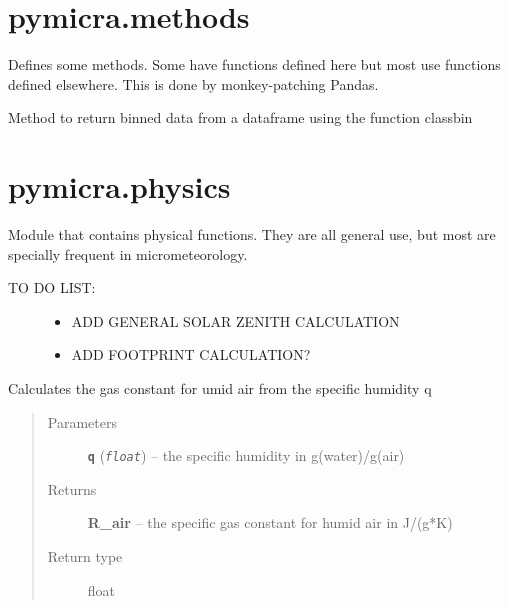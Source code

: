 \documentclass[a4paper,10pt,oneside]{sphinxmanual}
\begin{document}
\section{pymicra.methods}
\label{pymicra:module-pymicra.methods}\label{pymicra:pymicra-methods}
Defines some methods. Some have functions defined here but most use
functions defined elsewhere. This is done by monkey-patching Pandas.

\begin{fulllineitems}
\label{pymicra:pymicra.methods.binwrapper}
Method to return binned data from a dataframe using the function classbin

\end{fulllineitems}



\section{pymicra.physics}
\label{pymicra:module-pymicra.physics}\label{pymicra:pymicra-physics}
Module that contains physical functions. They are all general use, but
most are specially frequent in micrometeorology.
\begin{description}
\item[{TO DO LIST:}] \leavevmode\begin{itemize}
\item {} 
ADD GENERAL SOLAR ZENITH CALCULATION

\item {} 
ADD FOOTPRINT CALCULATION?

\end{itemize}

\end{description}

\begin{fulllineitems}
\label{pymicra:pymicra.physics.R_moistAir}
Calculates the gas constant for umid air from the specific humidity q
\begin{quote}\begin{description}
\item[{Parameters}] \leavevmode
\textbf{\texttt{q}} (\emph{\texttt{float}}) -- the specific humidity in g(water)/g(air)

\item[{Returns}] \leavevmode
\textbf{R\_air} -- the specific gas constant for humid air in J/(g*K)

\item[{Return type}] \leavevmode
float

\end{description}\end{quote}

\end{fulllineitems}
\end{document}
